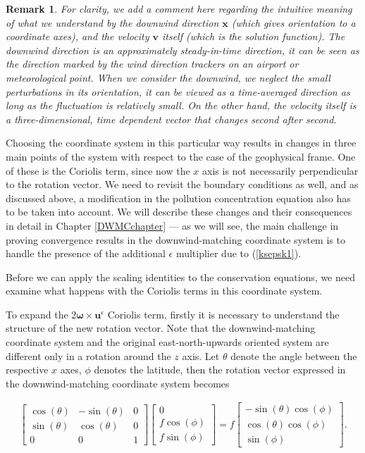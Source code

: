 \documentclass[12pt]{report}
\numberwithin{theorem}{chapter}
\numberwithin{corollary}{chapter}
\numberwithin{lemma}{chapter}
\newtheorem{remark}{Remark}
\numberwithin{remark}{chapter}
\numberwithin{definition}{chapter}
\numberwithin{prop}{chapter}
\begin{document}
\begin{remark} \normalfont
For clarity, we add a comment here regarding the intuitive meaning of what we understand by the downwind direction $\mathbf{x}$ (which gives orientation to a coordinate axes), and the velocity $\mathbf{v}$ itself (which is the solution function). The downwind direction is an approximately steady-in-time direction, it can be seen as the direction marked by the wind direction trackers on an airport or meteorological point. When we consider the downwind, we neglect the small perturbations in its orientation, it can be viewed as a time-averaged direction as long as the fluctuation is relatively small. On the other hand, the velocity itself is a three-dimensional, time dependent vector that changes second after second.
\end{remark}

Choosing the coordinate system in this particular way results in changes in three main points of the system with respect to the case of the geophysical frame. One of these is the Coriolis term, since now the $x$ axis is not necessarily perpendicular to the rotation vector. We need to revisit the boundary conditions as well, and as discussed above, a modification in the pollution concentration equation also has to be taken into account. We will describe these changes and their consequences in detail in Chapter \ref{DWMCchapter} --- as we will see, the main challenge in proving convergence results in the downwind-matching coordinate system is to handle the presence of the additional $\epsilon$ multiplier due to (\ref{ksepsk1}).

Before we can apply the scaling identities to the conservation equations, we need examine what happens with the Coriolis terms in this coordinate system.

To expand the $2 \mathbf{\omega} \times \mathbf{u}^\epsilon$ Coriolis term, firstly it is necessary to understand the structure of the new rotation vector. Note that the downwind-matching coordinate system and the original east-north-upwards oriented system are different only in a rotation around the $z$ axis. Let $\theta$ denote the angle between the respective $x$ axes, $\phi$ denotes the latitude, then the rotation vector expressed in the downwind-matching coordinate system becomes

\begin{gather}
 \begin{bmatrix} \cos(\theta) & -\sin(\theta) & 0 \\ \sin(\theta) & \cos(\theta) & 0 \\ 0 & 0 & 1 \end{bmatrix} \begin{bmatrix} 0 \\ f \cos(\phi) \\ f \sin(\phi) \end{bmatrix}
 =
  f \begin{bmatrix} -\sin(\theta)\cos(\phi) \\ \cos(\theta) \cos(\phi) \\ \sin(\phi) \end{bmatrix}.
\end{gather}
\end{document}
